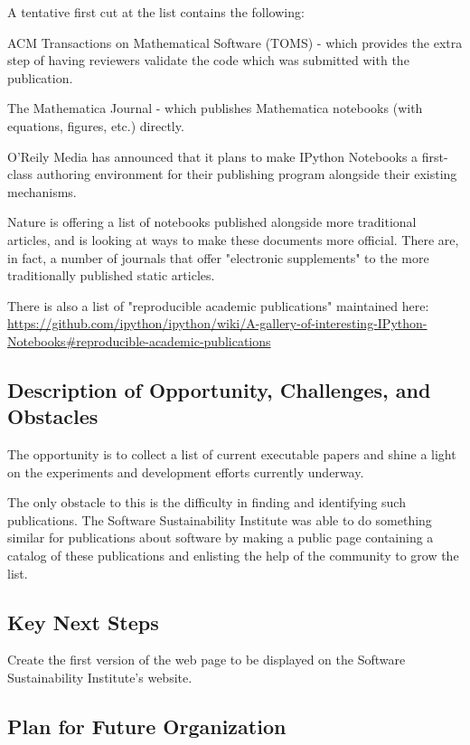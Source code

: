 A tentative first cut at the list contains the following:
\begin{enumeration}
\item ACM Transactions on Mathematical Software (TOMS) - which provides the extra step
 of having reviewers validate the code which was submitted with the publication.
\item The Mathematica Journal - which publishes Mathematica notebooks (with equations,
figures, etc.) directly.
\item O'Reily Media has announced that it plans to make IPython Notebooks a first-class
 authoring environment for their publishing program alongside their existing mechanisms.
\item Nature is offering a list of notebooks published alongside more traditional articles,
 and is looking at ways to make these documents more official. There are, in fact, a
 number of journals that offer "electronic supplements" to the more traditionally published
 static articles.
\item There is also a list of "reproducible academic publications" maintained here:
  \url{https://github.com/ipython/ipython/wiki/A-gallery-of-interesting-IPython-Notebooks#reproducible-academic-publications}
\end{enumeration}

\subsection{Description of Opportunity, Challenges, and Obstacles}

The opportunity is to collect a list of current executable papers and
shine a light on the experiments and development efforts currently underway.

The only obstacle to this is the difficulty in finding and identifying such
publications. The Software Sustainability Institute was able to do something similar
for publications about software by making a public page containing a catalog
of these publications and enlisting the help of the community to grow the list.

\subsection{Key Next Steps}

Create the first version of the web page to be displayed on the Software Sustainability
Institute's website.

\subsection{Plan for Future Organization}

